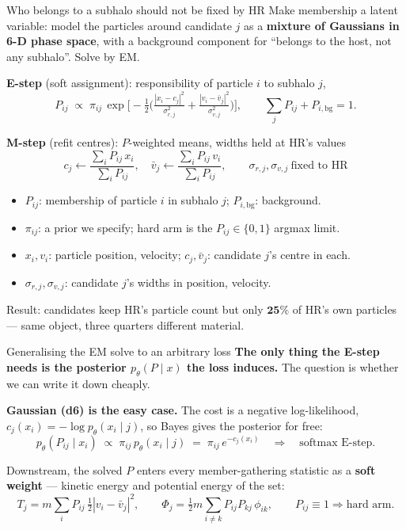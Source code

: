 \documentclass[aspectratio=169]{beamer}
\begin{document}
\begin{frame}{Who belongs to a subhalo should not be fixed by HR}
\small
Make membership a latent variable: model the particles around candidate $j$ as a
\textbf{mixture of Gaussians in 6-D phase space}, with a background component for
``belongs to the host, not any subhalo''. Solve by EM.

\vspace{0.15cm}
\textbf{E-step} (soft assignment): responsibility of particle $i$ to subhalo $j$,
\[
P_{ij} \;\propto\; \pi_{ij}\,
\exp\!\Big[-\tfrac{1}{2}\Big(
\tfrac{|x_i-c_j|^2}{\sigma_{r,j}^2}+\tfrac{|v_i-\bar v_j|^2}{\sigma_{v,j}^2}
\Big)\Big],
\qquad \textstyle\sum_j P_{ij} + P_{i,\mathrm{bg}} = 1.
\]

\textbf{M-step} (refit centres): $P$-weighted means, widths held at HR's values
\[
c_j\leftarrow\frac{\sum_i P_{ij}\,x_i}{\sum_i P_{ij}},\quad
\bar v_j\leftarrow\frac{\sum_i P_{ij}\,v_i}{\sum_i P_{ij}},\qquad
\sigma_{r,j},\sigma_{v,j}\ \text{fixed to HR}
\]
\vspace{0.1cm}
\begin{itemize}\footnotesize
    \item $P_{ij}$: membership of particle $i$ in subhalo $j$; $P_{i,\mathrm{bg}}$: background.
    \item $\pi_{ij}$: a prior we specify; hard arm is the $P_{ij}\!\in\!\{0,1\}$ argmax limit.
    \item $x_i,v_i$: particle position, velocity; $c_j,\bar v_j$: candidate $j$'s centre in each.
    \item $\sigma_{r,j},\sigma_{v,j}$: candidate $j$'s widths in position, velocity.
\end{itemize}
\vspace{0.05cm}

{\footnotesize Result: candidates keep HR's particle count but only
$\mathbf{25\%}$ of HR's own particles --- same object, three quarters different
material.}
\end{frame}

\begin{frame}{Generalising the EM solve to an arbitrary loss}
\small
\textbf{The only thing the E-step needs is the posterior $p_\theta(P\mid x)$ the
loss induces.} The question is whether we can write it down cheaply.

\vspace{0.2cm}
\textbf{Gaussian (d6) is the easy case.} The cost is a negative log-likelihood,
$c_j(x_i)=-\log p_\theta(x_i\mid j)$, so Bayes gives the posterior for free:
\[
p_\theta(P_{ij}\mid x_i)\;\propto\;\pi_{ij}\,p_\theta(x_i\mid j)
\;=\;\pi_{ij}\,e^{-c_j(x_i)}
\quad\Longrightarrow\quad\text{softmax E-step.}
\]

\vspace{0.2cm}
Downstream, the solved $P$ enters every member-gathering statistic as a
\textbf{soft weight} --- kinetic energy and potential energy of the set:
\[
T_j=m\sum_i P_{ij}\,\tfrac12|v_i-\bar v_j|^2,
\qquad
\Phi_j=\tfrac12 m\!\sum_{i\neq k}P_{ij}P_{kj}\,\phi_{ik},
\qquad
P_{ij}\!\equiv\!1 \Rightarrow \text{hard arm.}
\]
\end{frame}
\end{document}
